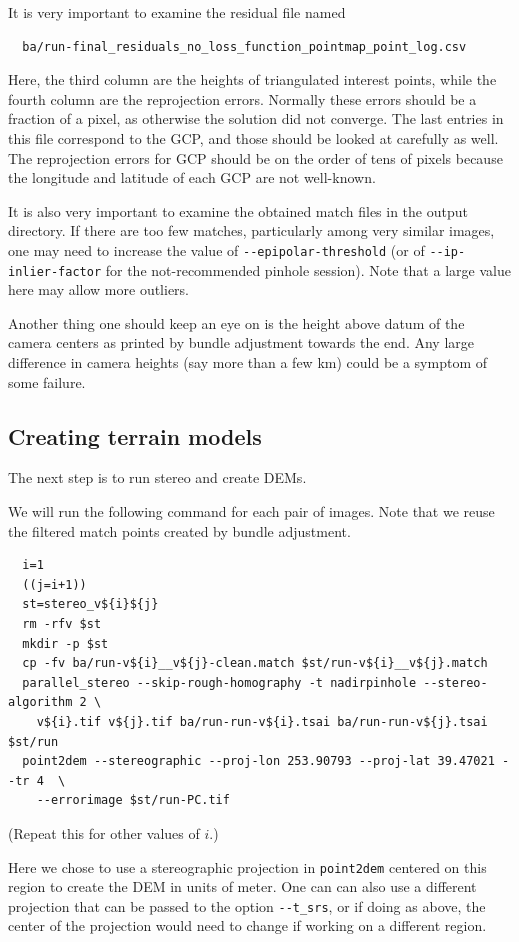 It is very important to examine the residual file named
\begin{verbatim}
  ba/run-final_residuals_no_loss_function_pointmap_point_log.csv
\end{verbatim}
Here, the third column are the heights of triangulated interest points,
while the fourth column are the reprojection errors.  Normally these
errors should be a fraction of a pixel, as otherwise the solution did not
converge. The last entries in this file correspond to the GCP, and
those should be looked at carefully as well. The reprojection errors for GCP
should be on the order of tens of pixels because the longitude and latitude
of each GCP are not well-known. 

It is also very important to examine the obtained match files in the 
output directory. If there are too few matches, particularly among very similar
images, one may need to increase the value of 
\texttt{-\/-epipolar-threshold} (or of \texttt{-\/-ip-inlier-factor} for 
the not-recommended pinhole session). Note that a large value here may allow more outliers. 

Another thing one should keep an eye on is the height above datum
of the camera centers as printed by bundle adjustment towards the end. 
Any large difference in camera heights (say more than a few km) could
be a symptom of some failure.

\subsection{Creating terrain models}
\label{skysat:stereo}

The next step is to run stereo and create DEMs.

We will run the following command for each pair of images. Note
that we reuse the filtered match points created by bundle adjustment. 
\begin{verbatim}
  i=1
  ((j=i+1))
  st=stereo_v${i}${j}
  rm -rfv $st
  mkdir -p $st
  cp -fv ba/run-v${i}__v${j}-clean.match $st/run-v${i}__v${j}.match
  parallel_stereo --skip-rough-homography -t nadirpinhole --stereo-algorithm 2 \
    v${i}.tif v${j}.tif ba/run-run-v${i}.tsai ba/run-run-v${j}.tsai $st/run
  point2dem --stereographic --proj-lon 253.90793 --proj-lat 39.47021 --tr 4  \
    --errorimage $st/run-PC.tif
\end{verbatim} %
(Repeat this for other values of $i$.)

Here we chose to use a stereographic projection in \texttt{point2dem}
centered on this region to create the DEM in units of meter. One can can
also use a different projection that can be passed to the option
\texttt{-\/-t\_srs}, or if doing as above, the center of the projection
would need to change if working on a different region.

